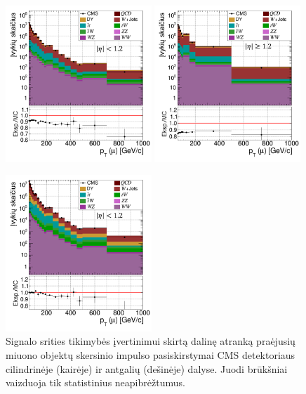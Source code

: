 \documentclass[a4paper, 12pt, oneside]{article}
\begin{document}
\begin{figure}[t!]
	\RawFloats
	\includegraphics[width=0.49\textwidth]{Magistrinis/pT_mu_barrel.png}
	\includegraphics[width=0.49\textwidth]{Magistrinis/pT_mu_endcap.png}
	\caption{\label{fig:FRpT_mu}
		Signalo srities tikimybės įvertinimui skirtą dalinę atranką praėjusių miuono objektų skersinio
		impulso pasiskirstymai CMS detektoriaus cilindrinėje (kairėje) ir antgalių (dešinėje) dalyse.
		Juodi brūkšniai vaizduoja tik statistinius neapibrėžtumus.}
	\vspace{1cm}
	\includegraphics[width=0.49\textwidth]{Magistrinis/pT_mu_barrel_FIT.png}

\end{figure}
\end{document}

